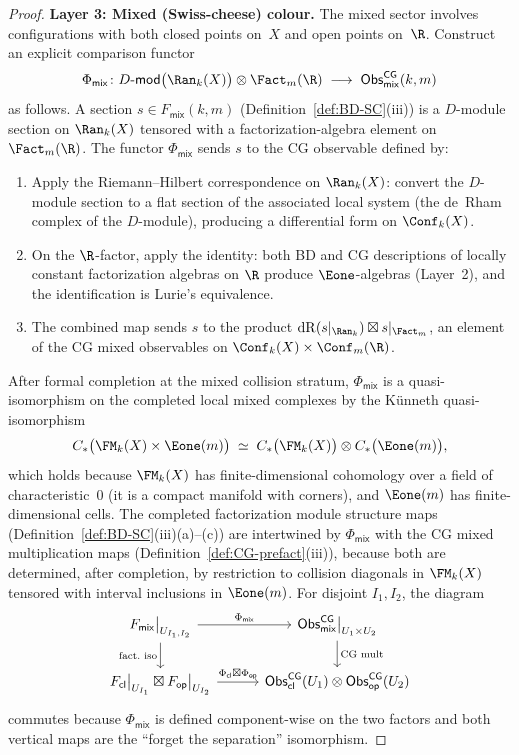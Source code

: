 \begin{proof}
\medskip\noindent
\textbf{Layer 3: Mixed (Swiss-cheese) colour.}
The mixed sector involves configurations with both closed points
on~$X$ and open points on~$\R$. Construct an explicit
comparison functor
\[
 \Phi_{\mathsf{mix}}\colon
 \Dmod\bigl(\Ran_k(X)\bigr) \otimes \Fact_m(\R)
 \;\longrightarrow\;
 \Obs^{\mathsf{CG}}_{\mathsf{mix}}(k,m)
\]
as follows. A section $s \in F_{\mathsf{mix}}(k,m)$
(Definition~\ref{def:BD-SC}(iii)) is a $D$-module section on
$\Ran_k(X)$ tensored with a factorization-algebra element on
$\Fact_m(\R)$. The functor $\Phi_{\mathsf{mix}}$ sends $s$ to
the CG observable defined by:
\begin{enumerate}[label=\textup{(\alph*)}]
\item Apply the Riemann--Hilbert correspondence on $\Ran_k(X)$:
 convert the $D$-module section to a flat section of the
 associated local system (the de~Rham complex of the
 $D$-module), producing a differential form on
 $\Conf_k(X)$.
\item On the $\R$-factor, apply the identity: both BD and CG
 descriptions of locally constant factorization algebras on
 $\R$ produce $\Eone$-algebras (Layer~2), and the
 identification is Lurie's equivalence.
\item The combined map sends $s$ to the product
 $\mathrm{dR}(s|_{\Ran_k}) \boxtimes s|_{\Fact_m}$, an
 element of the CG mixed observables on $\Conf_k(X) \times
 \Conf_m(\R)$.
\end{enumerate}
After formal completion at the mixed collision stratum,
$\Phi_{\mathsf{mix}}$ is a quasi-isomorphism on the completed local
mixed complexes by the K\"unneth quasi-isomorphism
\[
 C_\ast\bigl(\FM_k(X) \times \Eone(m)\bigr)
 \;\simeq\;
 C_\ast\bigl(\FM_k(X)\bigr) \otimes C_\ast\bigl(\Eone(m)\bigr),
\]
which holds because $\FM_k(X)$ has finite-dimensional cohomology
over a field of characteristic~$0$ (it is a compact manifold
with corners), and $\Eone(m)$ has finite-dimensional cells.
The completed factorization module structure maps
(Definition~\ref{def:BD-SC}(iii)(a)--(c)) are intertwined by
$\Phi_{\mathsf{mix}}$ with the CG mixed multiplication maps
(Definition~\ref{def:CG-prefact}(iii)), because both are
determined, after completion, by restriction to collision diagonals in
$\FM_k(X)$ tensored with interval inclusions in $\Eone(m)$.
For disjoint $I_1, I_2$, the diagram
\[
\begin{tikzcd}[column sep=3em]
F_{\mathsf{mix}}\big|_{U_{I_1,I_2}} \ar[r, "\Phi_{\mathsf{mix}}"] \ar[d, "\text{fact.\ iso}"'] &
\Obs^{\mathsf{CG}}_{\mathsf{mix}}\big|_{U_1 \times U_2} \ar[d, "\text{CG mult}"] \\
F_{\mathsf{cl}}\big|_{U_{I_1}} \boxtimes F_{\mathsf{op}}\big|_{U_{I_2}} \ar[r, "\Phi_{\mathsf{cl}} \boxtimes \Phi_{\mathsf{op}}"] &
\Obs^{\mathsf{CG}}_{\mathsf{cl}}(U_1) \otimes \Obs^{\mathsf{CG}}_{\mathsf{op}}(U_2)
\end{tikzcd}
\]
commutes because $\Phi_{\mathsf{mix}}$ is defined component-wise on the two factors and both vertical maps are the ``forget the separation'' isomorphism.


\end{proof}
